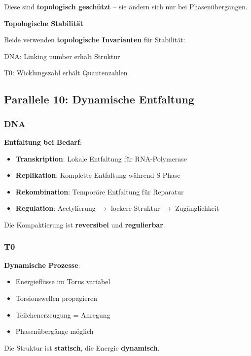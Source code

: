 	Diese sind \textbf{topologisch geschützt} -- sie ändern sich nur bei Phasenübergängen.

	\begin{keyresult}
		\textbf{Topologische Stabilität}

		Beide verwenden \textbf{topologische Invarianten} für Stabilität:

		DNA: Linking number erhält Struktur

		T0: Wicklungszahl erhält Quantenzahlen
	\end{keyresult}

	\subsection{Parallele 10: Dynamische Entfaltung}

	\subsubsection{DNA}

	\textbf{Entfaltung bei Bedarf}:

	\begin{itemize}
		\item \textbf{Transkription}: Lokale Entfaltung für RNA-Polymerase
		\item \textbf{Replikation}: Komplette Entfaltung während S-Phase
		\item \textbf{Rekombination}: Temporäre Entfaltung für Reparatur
		\item \textbf{Regulation}: Acetylierung $\to$ lockere Struktur $\to$ Zugänglichkeit
	\end{itemize}

	Die Kompaktierung ist \textbf{reversibel} und \textbf{regulierbar}.

	\subsubsection{T0}

	\textbf{Dynamische Prozesse}:
	\begin{itemize}
		\item Energieflüsse im Torus variabel
		\item Torsionswellen propagieren
		\item Teilchenerzeugung = Anregung
		\item Phasenübergänge möglich
	\end{itemize}

	Die Struktur ist \textbf{statisch}, die Energie \textbf{dynamisch}.


